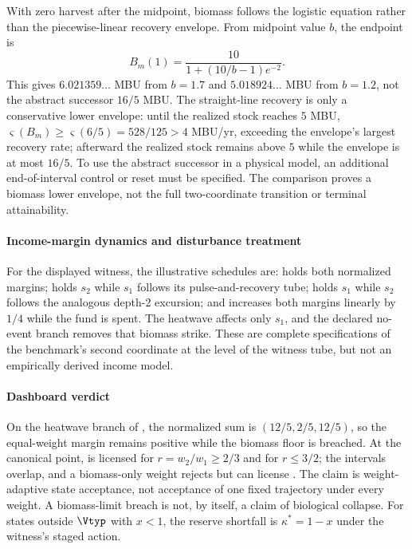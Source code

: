 With zero harvest after the midpoint, biomass follows the logistic equation rather than the piecewise-linear recovery envelope. From midpoint value $b$, the endpoint is
\[
B_m(1)=\frac{10}{1+(10/b-1)e^{-2}}.
\]
This gives $6.021359\ldots$ MBU from $b=1.7$ and $5.018924\ldots$ MBU from $b=1.2$, not the abstract successor $16/5$ MBU. The straight-line recovery is only a conservative lower envelope: until the realized stock reaches $5$ MBU, $\varsigma(B_m)\ge\varsigma(6/5)=528/125>4$ MBU/yr, exceeding the envelope's largest recovery rate; afterward the realized stock remains above $5$ while the envelope is at most $16/5$. To use the abstract successor in a physical model, an additional end-of-interval control or reset must be specified. The comparison proves a biomass lower envelope, not the full two-coordinate transition or terminal attainability.

\paragraph{Income-margin dynamics and disturbance treatment} For the displayed witness, the illustrative schedules are:  holds both normalized margins;  holds $s_2$ while $s_1$ follows its pulse-and-recovery tube;  holds $s_1$ while $s_2$ follows the analogous depth-2 excursion; and  increases both margins linearly by $1/4$ while the fund is spent. The heatwave affects only $s_1$, and the declared no-event branch removes that biomass strike. These are complete specifications of the benchmark's second coordinate at the level of the witness tube, but not an empirically derived income model.

\paragraph{Dashboard verdict} On the heatwave branch of , the normalized sum is $(12/5,2/5,12/5)$, so the equal-weight margin remains positive while the biomass floor is breached. At the canonical point,  is licensed for $r=w_2/w_1\ge2/3$ and  for $r\le3/2$; the intervals overlap, and a biomass-only weight rejects  but can license . The claim is weight-adaptive state acceptance, not acceptance of one fixed trajectory under every weight. A biomass-limit breach is not, by itself, a claim of biological collapse. For states outside $\Vtyp$ with $x<1$, the reserve shortfall is $\kappa^*=1-x$ under the witness's staged action.

